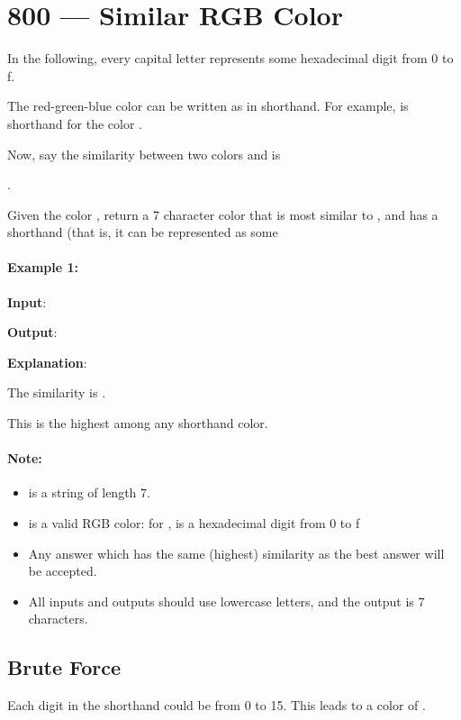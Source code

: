 \section{800 --- Similar RGB Color}
In the following, every capital letter represents some hexadecimal digit from 0 to f.

The red-green-blue color  can be written as  in shorthand.  For example,  is shorthand for the color .

Now, say the similarity between two colors  and  is 

.

Given the color , return a 7 character color that is most similar to , and has a shorthand (that is, it can be represented as some 

\paragraph{Example 1:}

\begin{flushleft}
\textbf{Input}: 

\textbf{Output}: 

\textbf{Explanation}:  

The similarity is .

This is the highest among any shorthand color.
\end{flushleft}

\paragraph{Note:}

\begin{itemize}
\item {} is a string of length 7.
\item {} is a valid RGB color: for ,  is a hexadecimal digit from 0 to f
\item Any answer which has the same (highest) similarity as the best answer will be accepted.
\item All inputs and outputs should use lowercase letters, and the output is 7 characters.
\end{itemize}

\subsection{Brute Force}
Each digit in the shorthand  could be from 0 to 15. This leads to a color of 
. 

